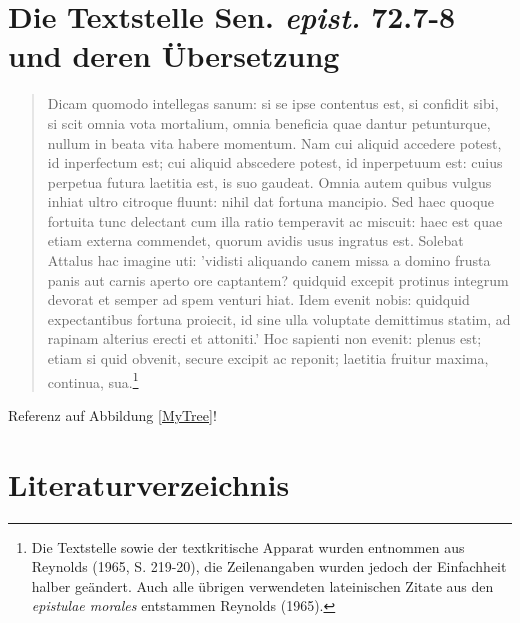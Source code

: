 \documentclass[12pt,a4paper]{article}
\begin{document}
\newpage
\section{Die Textstelle Sen. \textit{epist.} 72.7-8 und deren Übersetzung}
\renewcommand\linenumberfont{\normalfont\small}
\begin{linenumbers}
\begin{quotation}
\selectfont
Dicam quomodo intellegas sanum: si se ipse contentus est, si confidit sibi, si scit omnia vota mortalium, omnia beneficia quae dantur petunturque, nullum in beata vita habere momentum. Nam cui aliquid accedere potest, id inperfectum est; cui aliquid abscedere potest, id inperpetuum est: cuius perpetua futura laetitia est, is suo gaudeat. Omnia autem quibus vulgus inhiat ultro citroque fluunt: nihil dat fortuna mancipio. Sed haec quoque fortuita tunc delectant cum illa ratio temperavit ac miscuit: haec est quae etiam externa commendet, quorum avidis usus ingratus est. Solebat Attalus hac imagine uti: 'vidisti aliquando canem missa a domino frusta panis aut carnis aperto ore captantem? quidquid excepit protinus integrum devorat et semper ad spem venturi hiat. Idem evenit nobis: quid\-quid expectantibus fortuna proiecit, id sine ulla voluptate demittimus statim, ad rapinam alterius erecti et attoniti.' Hoc sapienti non evenit: plenus est; etiam si quid obvenit, secure excipit ac reponit; laetitia fruitur maxima, continua, sua.\footnote{Die Textstelle sowie der textkritische Apparat wurden entnommen aus Reynolds (1965, S. 219-20), die Zeilenangaben wurden jedoch der Einfachheit halber geändert. Auch alle übrigen verwendeten lateinischen Zitate aus den \textit{epistulae morales} entstammen Reynolds (1965).}
\end{quotation}
\end{linenumbers}
\vspace{0.5cm}
\selectfont

Referenz auf Abbildung \ref{MyTree}!
%
\pagebreak
\section*{Literaturverzeichnis}
\bibbycategory
{}
\end{document}
